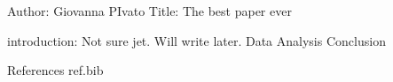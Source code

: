 Author: Giovanna PIvato
Title: The best paper ever

introduction: Not sure jet. Will write later.
Data
Analysis
Conclusion

References
ref.bib
